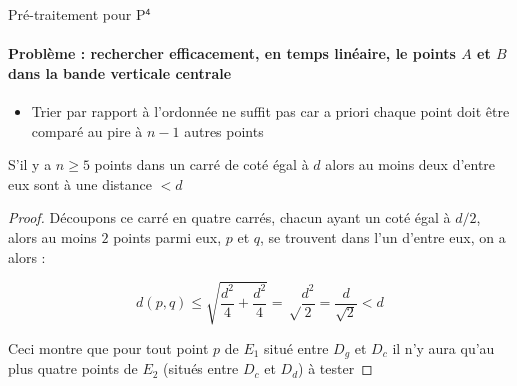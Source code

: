 \documentclass[aspectratio=1610,francais,envcountsect]{beamer}
\begin{document}
\begin{frame}[allowframebreaks]{Pré-traitement pour P$^\mathsf{4}$
    \insertcontinuationtext}

  \framesubtitle{Problème : rechercher efficacement, en temps
    linéaire, le points $A$ et $B$ dans la bande verticale centrale}

  \begin{itemize}
  \item Trier par rapport à l’ordonnée ne suffit pas car a priori
    chaque point doit être comparé au pire à $n - 1$ autres points
  \end{itemize}

  
  \begin{theorem}
    S’il y a $n\geq 5$ points dans un carré de coté égal à $d$ alors
    au moins deux d’entre eux sont à une distance $< d$
  \end{theorem}
  \begin{proof}
    Découpons ce carré en quatre carrés, chacun ayant un coté égal à
    $d/2$, alors au moins $2$ points parmi eux, $p$ et $q$, se
    trouvent dans l’un d’entre eux, on a alors :
    
    \begin{equation}
      \label{eq:p4}
      d(p,q) \leq \sqrt{\frac{d^2}{4} + \frac{d^2}{4}} = \sqrt\frac{d^2}{2} = \frac{d}{\sqrt{2}} < d
    \end{equation}

    Ceci montre que pour tout point $p$ de $E_1$ situé entre $D_g$ et
    $D_c$ il n’y aura qu’au plus quatre points de $E_2$ (situés entre
    $D_c$ et $D_d$) à tester
  \end{proof}
\end{frame}
\end{document}
